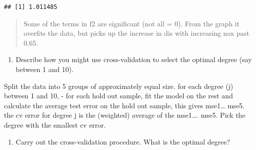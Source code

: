 \documentclass[]{article}
\providecommand{\tightlist}{%
  \setlength{\itemsep}{0pt}\setlength{\parskip}{0pt}}
\begin{document}
\begin{verbatim}
## [1] 1.011485
\end{verbatim}

\begin{quote}
Some of the terms in f2 are significant (not all = 0). From the graph it
overfits the data, but picks up the increase in dis with increasing nox
past 0.65.
\end{quote}

\begin{enumerate}
\def\labelenumi{(\alph{enumi})}
\setcounter{enumi}{2}
\tightlist
\item
  Describe how you might use cross-validation to select the optimal
  degree (say between 1 and 10).
\end{enumerate}

Split the data into 5 groups of approximately equal size. for each
degree (j) between 1 and 10, - for each hold out sample, fit the model
on the rest and calculate the average test error on the hold out sample,
this gives mse1\ldots{} mse5. the cv error for degree j is the
(weighted) average of the mse1\ldots{}. mse5. Pick the degree with the
smallest cv error.

\begin{enumerate}
\def\labelenumi{(\alph{enumi})}
\setcounter{enumi}{3}
\tightlist
\item
  Carry out the cross-validation procedure. What is the optimal degree?
\end{enumerate}
\end{document}
